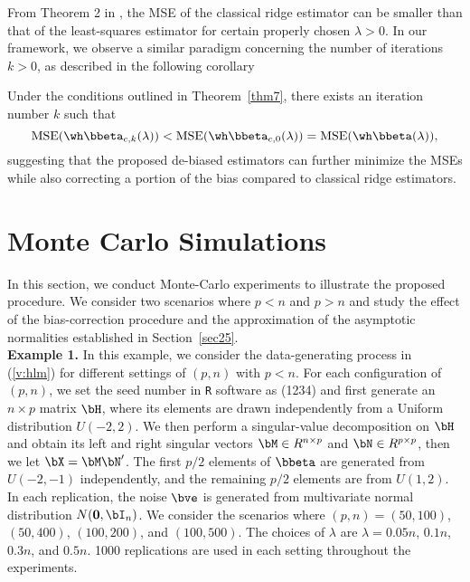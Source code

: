 From Theorem 2 in \cite{theobald1974generalizations}, the MSE of the classical ridge estimator can be smaller than that of the least-squares estimator for certain properly chosen $\lambda>0$. In our framework, we observe a similar paradigm concerning the number of iterations $k>0$, as described in the following corollary
\begin{corollary}
Under the conditions outlined in Theorem~\ref{thm7}, there exists an iteration number 
$k$ such that
    \[\text{MSE}(\wh\bbeta_{c,k}(\lambda))<\text{MSE}(\wh\bbeta_{c,0}(\lambda))=\text{MSE}(\wh\bbeta(\lambda)),\]
     suggesting that the proposed de-biased estimators can further minimize the MSEs while also correcting a portion of the bias compared to classical ridge estimators.
\end{corollary}



  \section{Monte Carlo Simulations }\label{sec3}
In this section, we conduct Monte-Carlo experiments to illustrate the proposed procedure. We consider two scenarios where $p<n$ and $p>n$ and study the effect of the bias-correction procedure and the approximation of the asymptotic normalities established in Section~\ref{sec25}.\\

{\noindent\bf Example 1.} In this example, we consider the data-generating process in (\ref{v:hlm}) for different settings of $(p,n)$ with $p<n$. For each configuration of  $(p,n)$, we set the seed number in \texttt{R} software as (1234) and first generate an $n\times p$ matrix $\bH$, where its elements are drawn independently from a Uniform distribution $U(-2,2)$. We then perform a singular-value decomposition on $\bH$ and obtain its left and right singular vectors $\bM\in R^{n\times p}$ and $\bN\in R^{p\times p}$, then we let $\bX=\bM\bN'$. The first $p/2$ elements of $\bbeta$ are generated from $U(-2,-1)$ independently, and the remaining $p/2$ elements are from $U(1,2)$. In each replication, the noise $\bve$ is generated from multivariate normal distribution $N({\bf 0},\bI_n)$. We consider the scenarios where $(p,n)=(50,100)$, $(50,400)$, $(100,200)$, and $(100,500)$. The choices of $\lambda$ are $\lambda=0.05n$, $0.1n$, $0.3n$, and $0.5n$. 1000 replications are used in each setting throughout the experiments.

